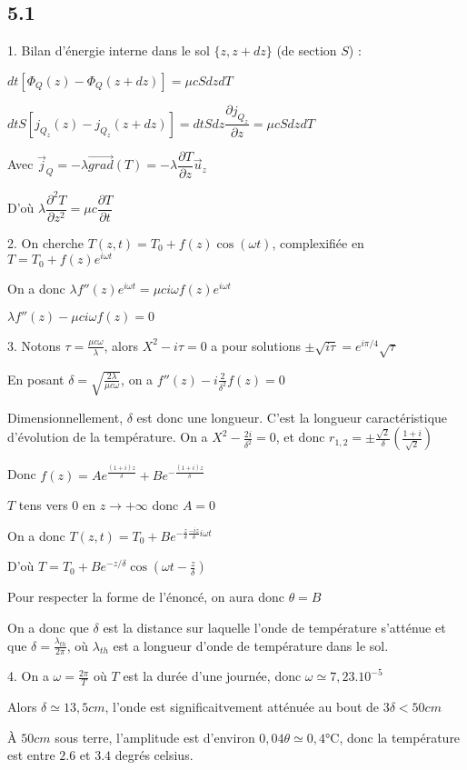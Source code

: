 \documentclass[a4paper,12pt]{book}
\begin{document}
\subsection{5.1}
1. Bilan d'énergie interne dans le sol $\{z,z+dz\}$ (de section $S$) : \par $dt[\Phi_Q(z)-\Phi_Q(z+dz)]=\mu cSdzdT$ \par $dtS[j_{Q_z}(z)-j_{Q_z}(z+dz)]=dtSdz\dfrac{\partial j_{Q_z}}{\partial z} = \mu cSdzdT$ \par Avec $\vec{j}_Q = -\lambda\vec{grad}(T)=-\lambda\dfrac{\partial T}{\partial z}\vec{u}_z$\par D'où $\lambda\dfrac{\partial^2T}{\partial z^2}=\mu c\dfrac{\partial T}{\partial t}$
\par 2. On cherche $T(z,t)= T_0+f(z)\cos(\omega t)$, complexifiée en $T=T_0+f(z)e^{i\omega t}$ \par On a donc $\lambda f''(z)e^{i\omega t}=\mu ci\omega f(z)e^{i\omega t}$ \par $\lambda f''(z)-\mu c i\omega f(z) = 0$
\par 3. Notons $\tau = \frac{\mu c\omega}{\lambda}$, alors $X^2-i\tau=0$ a pour solutions $\pm\sqrt{i\tau}=e^{i\pi/4}\sqrt{\tau}$
\par En posant $\delta = \sqrt{\frac{2\lambda}{\mu c\omega}}$, on a $f''(z)-i\frac{2}{\delta^2}f(z)=0$ \par Dimensionnellement, $\delta$ est donc une longueur. C'est la longueur caractéristique d'évolution de la température. On a $X^2-\frac{2i}{\delta^2}=0$, et donc $r_{1,2}=\pm\frac{\sqrt{2}}{\delta}\left(\frac{1+i}{\sqrt{2}}\right)$ \par Donc $f(z) = Ae^{\frac{(1+i)z}{\delta}}+Be^{-\frac{(1+i)z}{\delta}}$ \par $T$ tens vers $0$ en $z\to+\infty$ donc $A=0$ \par On a donc $T(z,t)=T_0+Be^{-\frac{z}{\delta}\frac{-iz}{\delta}i\omega t}$ \par D'où $T=T_0+Be^{-z/\delta}\cos(\omega t-\frac{z}{\delta})$ \par Pour respecter la forme de l'énoncé, on aura donc $\theta = B$
\par On a donc que $\delta$ est la distance sur laquelle l'onde de température s'atténue et que $\delta =\frac{\lambda_{th}}{2\pi}$, où $\lambda_{th}$ est a longueur d'onde de température dans le sol.
\par 4. On a $\omega = \frac{2\pi}{T}$ où $T$ est la durée d'une journée, donc $\omega \simeq 7,23.10^{-5}$ \par Alors $\delta  \simeq 13,5 cm$, l'onde est significaitvement atténuée au bout de $3\delta<50 cm$ \par À $50cm$ sous terre, l'amplitude est d'environ $0,04\theta\simeq 0,4$°C, donc la température est entre $2.6$ et $3.4$ degrés celsius.
\end{document}
